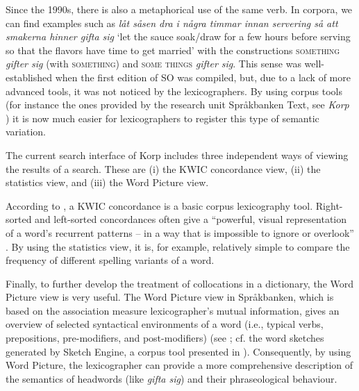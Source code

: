 \documentclass[output=paper]{langscibook}
\begin{document}
Since the 1990s, there is also a metaphorical use of the same verb. In corpora, we can find examples such as \textit{låt såsen dra i några timmar innan servering så att smakerna hinner gifta sig} `let the sauce soak\slash draw for a few hours before serving so that the flavors have time to get married' with the constructions \textsc{something} \emph{gifter sig} (with \textsc{something}) and \textsc{some things} \emph{gifter sig}. This sense was well-established when the first edition of SO was compiled, but, due to a lack of more advanced tools, it was not noticed by the lexicographers. By using corpus tools (for instance the ones provided by the research unit Språkbanken Text, see \textit{Korp} \citep{Borin2012}) it is now much easier for lexicographers to register this type of semantic variation.  

The current search interface of Korp \citep{Borin2012} includes three independent ways of viewing the results of a search. These are (i) the KWIC concordance view, (ii) the statistics view, and (iii) the Word Picture view. 

According to \citet{atkins2008}, a KWIC concordance is a basic corpus lexicography tool. Right-sorted and left-sorted concordances often give a ``powerful, visual representation of a word's recurrent patterns – in a way that is impossible to ignore or overlook'' \citep[105]{atkins2008}. By using the statistics view, it is, for example, relatively simple to compare the frequency of different spelling variants of a word.

Finally, to further develop the treatment of collocations in a dictionary, the Word Picture view is very useful. The Word Picture view in Språkbanken, which is based on the association measure lexicographer's mutual information, gives an overview of selected syntactical environments of a word (i.e., typical verbs, prepositions, pre-modifiers, and post-modifiers) (see \citealt[][476]{Borin2012}; cf. the word sketches generated by Sketch Engine, a corpus tool presented in \citealt{kilgarriff2004}). Consequently, by using Word Picture, the lexicographer can provide a more comprehensive description of the semantics of headwords (like \emph{gifta sig}) and their phraseological behaviour. 
\end{document}
